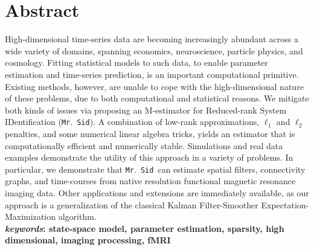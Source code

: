 \documentclass[fleqn]{article}
\newcommand{\mrsid}{{\sc \texttt{Mr}.~\texttt{Sid}}}
\begin{document}
\section*{Abstract}
High-dimensional time-series data are becoming increasingly abundant across a wide variety of domains, spanning economics, neuroscience,  particle physics, and cosmology.  Fitting statistical models to such data, to enable parameter estimation and time-series prediction, is an important computational primitive. 
Existing methods, however, are unable to cope with the high-dimensional nature of these problems, due to both computational and statistical reasons.  We mitigate both kinds of issues via proposing an M-estimator for Reduced-rank System IDentification (\mrsid). A combination of low-rank approximations, $\ell_1$ and $\ell_2$ penalties, and some numerical linear algebra tricks, yields an estimator that is computationally efficient and numerically stable.  Simulations and real data examples demonstrate the utility of this approach in a variety of problems.  In particular, we demonstrate that \mrsid~can estimate spatial filters, connectivity graphs, and time-courses from native resolution functional magnetic resonance imaging data.  Other applications and extensions are immediately available, as our approach is a generalization of the classical Kalman Filter-Smoother Expectation-Maximization algorithm.
\\
\textbf{\emph{keywords}: state-space model, parameter estimation, sparsity, high dimensional, imaging processing, fMRI}
\newpage
\end{document}
